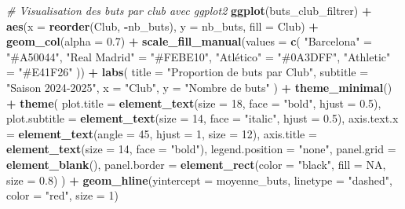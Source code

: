 \documentclass[
]{article}
\newenvironment{Shaded}{\begin{snugshade}}{\end{snugshade}}
\newcommand{\AttributeTok}[1]{\textcolor[rgb]{0.13,0.29,0.53}{#1}}
\newcommand{\CommentTok}[1]{\textcolor[rgb]{0.56,0.35,0.01}{\textit{#1}}}
\newcommand{\ConstantTok}[1]{\textcolor[rgb]{0.56,0.35,0.01}{#1}}
\newcommand{\DecValTok}[1]{\textcolor[rgb]{0.00,0.00,0.81}{#1}}
\newcommand{\FloatTok}[1]{\textcolor[rgb]{0.00,0.00,0.81}{#1}}
\newcommand{\FunctionTok}[1]{\textcolor[rgb]{0.13,0.29,0.53}{\textbf{#1}}}
\newcommand{\NormalTok}[1]{#1}
\newcommand{\OtherTok}[1]{\textcolor[rgb]{0.56,0.35,0.01}{#1}}
\newcommand{\SpecialCharTok}[1]{\textcolor[rgb]{0.81,0.36,0.00}{\textbf{#1}}}
\newcommand{\StringTok}[1]{\textcolor[rgb]{0.31,0.60,0.02}{#1}}
\begin{document}
\begin{Shaded}
\begin{Highlighting}[]
\CommentTok{\# Visualisation des buts par club avec ggplot2}
\FunctionTok{ggplot}\NormalTok{(buts\_club\_filtrer) }\SpecialCharTok{+}
  \FunctionTok{aes}\NormalTok{(}\AttributeTok{x =} \FunctionTok{reorder}\NormalTok{(Club, }\SpecialCharTok{{-}}\NormalTok{nb\_buts), }\AttributeTok{y =}\NormalTok{ nb\_buts, }\AttributeTok{fill =}\NormalTok{ Club) }\SpecialCharTok{+}
  \FunctionTok{geom\_col}\NormalTok{(}\AttributeTok{alpha =} \FloatTok{0.7}\NormalTok{) }\SpecialCharTok{+}
  \FunctionTok{scale\_fill\_manual}\NormalTok{(}\AttributeTok{values =} \FunctionTok{c}\NormalTok{(}
    \StringTok{"Barcelona"} \OtherTok{=} \StringTok{"\#A50044"}\NormalTok{,}
    \StringTok{"Real Madrid"} \OtherTok{=} \StringTok{"\#FEBE10"}\NormalTok{,}
    \StringTok{"Atlético"} \OtherTok{=} \StringTok{"\#0A3DFF"}\NormalTok{,}
    \StringTok{"Athletic"} \OtherTok{=} \StringTok{"\#E41F26"}
\NormalTok{  )) }\SpecialCharTok{+}
  \FunctionTok{labs}\NormalTok{(}
    \AttributeTok{title =} \StringTok{"Proportion de buts par Club"}\NormalTok{,}
    \AttributeTok{subtitle =} \StringTok{"Saison 2024{-}2025"}\NormalTok{,}
    \AttributeTok{x =} \StringTok{"Club"}\NormalTok{, }
    \AttributeTok{y =} \StringTok{"Nombre de buts"}
\NormalTok{  ) }\SpecialCharTok{+}
  \FunctionTok{theme\_minimal}\NormalTok{() }\SpecialCharTok{+}
  \FunctionTok{theme}\NormalTok{(}
    \AttributeTok{plot.title =} \FunctionTok{element\_text}\NormalTok{(}\AttributeTok{size =} \DecValTok{18}\NormalTok{, }\AttributeTok{face =} \StringTok{"bold"}\NormalTok{, }\AttributeTok{hjust =} \FloatTok{0.5}\NormalTok{),}
    \AttributeTok{plot.subtitle =} \FunctionTok{element\_text}\NormalTok{(}\AttributeTok{size =} \DecValTok{14}\NormalTok{, }\AttributeTok{face =} \StringTok{"italic"}\NormalTok{, }\AttributeTok{hjust =} \FloatTok{0.5}\NormalTok{),}
    \AttributeTok{axis.text.x =} \FunctionTok{element\_text}\NormalTok{(}\AttributeTok{angle =} \DecValTok{45}\NormalTok{, }\AttributeTok{hjust =} \DecValTok{1}\NormalTok{, }\AttributeTok{size =} \DecValTok{12}\NormalTok{),}
    \AttributeTok{axis.title =} \FunctionTok{element\_text}\NormalTok{(}\AttributeTok{size =} \DecValTok{14}\NormalTok{, }\AttributeTok{face =} \StringTok{"bold"}\NormalTok{),}
    \AttributeTok{legend.position =} \StringTok{"none"}\NormalTok{,}
    \AttributeTok{panel.grid =} \FunctionTok{element\_blank}\NormalTok{(),}
    \AttributeTok{panel.border =} \FunctionTok{element\_rect}\NormalTok{(}\AttributeTok{color =} \StringTok{"black"}\NormalTok{, }\AttributeTok{fill =} \ConstantTok{NA}\NormalTok{, }\AttributeTok{size =} \FloatTok{0.8}\NormalTok{)}
\NormalTok{  ) }\SpecialCharTok{+}
  \FunctionTok{geom\_hline}\NormalTok{(}\AttributeTok{yintercept =}\NormalTok{ moyenne\_buts, }\AttributeTok{linetype =} \StringTok{"dashed"}\NormalTok{, }\AttributeTok{color =} \StringTok{"red"}\NormalTok{, }\AttributeTok{size =} \DecValTok{1}\NormalTok{)}
\end{Highlighting}
\end{Shaded}
\end{document}
